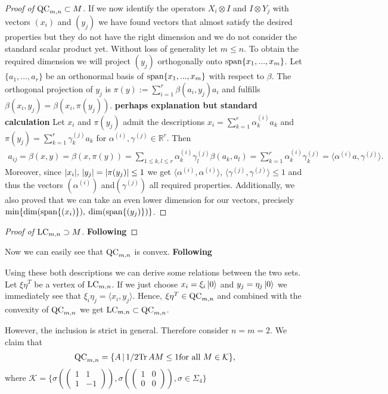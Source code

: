 \begin{proof}[Proof of $ \textup{QC}_{m,n} \subset M $]
	If we now identify the operators $ X_i \otimes I $ and $  I \otimes Y_j$ with vectors
	$ (x_i) $ and $ (y_j) $ we have found vectors that almost satisfy the desired properties but they do not have the right dimension and we do not consider the standard scalar product yet. Without loss of generality let $ m \le n $. To obtain the required dimension we will project $ (y_j) $ orthogonally onto $ \textup{span}\{ x_1,...,x_m \} $.
	Let $ \{a_1,...,a_r\} $ be an orthonormal basis of $ \textup{span} \{ x_1,...,x_m \} $ with respect to $ \beta $. 
	The orthogonal projection of $ y_j $ is $ \pi(y):= \sum_{i=1}^{r}\beta(a_i,y_j)a_i $ and fulfills
	$ \beta(x_i,y_j) = \beta(x_i,\pi(y_j)) $. \textbf{perhaps explanation but standard calculation}
	Let $ x_i $ and $ \pi(y_j) $ admit the descriptions 
	$ x_i = \sum_{k=1}^{r}\alpha_k^{(i)}a_k$ and $  \pi(y_j) = \sum_{k=1}^r \gamma_k^{(j)} a_k$ for $ \alpha^{(i)}, \gamma^{(j)} \in \mathbb{R}^r $. Then
	\begin{align*}
		a_{ij}= \beta(x,y)= \beta(x,\pi(y)) = \sum_{1 \le k,l \le r} \alpha_k^{(i)} \gamma_l^{(j)} \beta(a_k,a_l) = \sum_{k=1}^{r}\alpha_k^{(i)}\gamma_k^{(j)} = \langle \alpha^{(i)}a, \gamma^{(j)} \rangle.
	\end{align*}
	Moreover, since $ {\left|{x_i}\right|}, \, {\left|{y_j}\right|}= {\left|{\pi(y_j)}\right|} \le 1 $ we get $ \langle \alpha^{(i)}, \alpha^{(i)} \rangle, \, \langle \gamma^{(j)}, \gamma^{(j)} \rangle \le 1$ and thus the vectors $ (\alpha^{(i)}) $ and$ (\gamma^{(j)}) $ all required properties. 
	Additionally, we also proved that we can take an even lower dimension for our vectors, precisely 
	$ \min \{ \dim( \textup{span} \{ (x_i) \}),$ $ \dim(\textup{span} \{ (y_j) \} )\} $.
	 
	 
	
\end{proof}
\begin{proof}[Proof of $ \textup{LC}_{m,n} \supset M $]
	\textbf{Following}
\end{proof}
Now we can easily see that $ \textup{QC}_{m,n} $ is convex.   \textbf{Following}

Using these both descriptions we can derive some relations between the two sets. 
Let $ \xi\eta^T $ be a vertex of $ \textup{LC}_{m,n} $. If we just choose $ x_i = \xi_i \ket{0}$ and $ y_j = \eta_j\ket{0} $ we immediately see that $ \xi_i\eta_j = \langle x_i, y_j \rangle $. Hence, $ \xi\eta^T \in \textup{QC}_{m,n} $ and combined with the convexity of $ \textup{QC}_{m,n} $ we get $ \textup{LC}_{m,n} \subset \textup{QC}_{m,n} $.

However, the inclusion is strict in general. Therefore consider $ n=m=2 $. 
We claim that 
\begin{align*}
	\textup{QC}_{m,n} = \{ A \, | \, 1/2 \text{Tr} \, {AM}  \le 1 \textup{for all } M \in \mathcal{K} \},
\end{align*}
where $ \mathcal{K}  = \{ \sigma(\begin{pmatrix}
1 & 1 \\
1 & -1
\end{pmatrix}), \sigma(\begin{pmatrix}
1 & 0 \\
0 & 0
\end{pmatrix}), \sigma \in \Sigma_4  \} $
